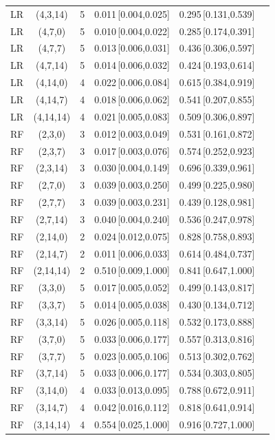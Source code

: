 \begin{longtable}{lccccc}
LR & (4,3,14) & 5 & 0.011\,[0.004,0.025] & 0.295\,[0.131,0.539] \\
LR & (4,7,0) & 5 & 0.010\,[0.004,0.022] & 0.285\,[0.174,0.391] \\
LR & (4,7,7) & 5 & 0.013\,[0.006,0.031] & 0.436\,[0.306,0.597] \\
LR & (4,7,14) & 5 & 0.014\,[0.006,0.032] & 0.424\,[0.193,0.614] \\
LR & (4,14,0) & 4 & 0.022\,[0.006,0.084] & 0.615\,[0.384,0.919] \\
LR & (4,14,7) & 4 & 0.018\,[0.006,0.062] & 0.541\,[0.207,0.855] \\
LR & (4,14,14) & 4 & 0.021\,[0.005,0.083] & 0.509\,[0.306,0.897] \\
RF & (2,3,0) & 3 & 0.012\,[0.003,0.049] & 0.531\,[0.161,0.872] \\
RF & (2,3,7) & 3 & 0.017\,[0.003,0.076] & 0.574\,[0.252,0.923] \\
RF & (2,3,14) & 3 & 0.030\,[0.004,0.149] & 0.696\,[0.339,0.961] \\
RF & (2,7,0) & 3 & 0.039\,[0.003,0.250] & 0.499\,[0.225,0.980] \\
RF & (2,7,7) & 3 & 0.039\,[0.003,0.231] & 0.439\,[0.128,0.981] \\
RF & (2,7,14) & 3 & 0.040\,[0.004,0.240] & 0.536\,[0.247,0.978] \\
RF & (2,14,0) & 2 & 0.024\,[0.012,0.075] & 0.828\,[0.758,0.893] \\
RF & (2,14,7) & 2 & 0.011\,[0.006,0.033] & 0.614\,[0.484,0.737] \\
RF & (2,14,14) & 2 & 0.510\,[0.009,1.000] & 0.841\,[0.647,1.000] \\
RF & (3,3,0) & 5 & 0.017\,[0.005,0.052] & 0.499\,[0.143,0.817] \\
RF & (3,3,7) & 5 & 0.014\,[0.005,0.038] & 0.430\,[0.134,0.712] \\
RF & (3,3,14) & 5 & 0.026\,[0.005,0.118] & 0.532\,[0.173,0.888] \\
RF & (3,7,0) & 5 & 0.033\,[0.006,0.177] & 0.557\,[0.313,0.816] \\
RF & (3,7,7) & 5 & 0.023\,[0.005,0.106] & 0.513\,[0.302,0.762] \\
RF & (3,7,14) & 5 & 0.033\,[0.006,0.177] & 0.534\,[0.303,0.805] \\
RF & (3,14,0) & 4 & 0.033\,[0.013,0.095] & 0.788\,[0.672,0.911] \\
RF & (3,14,7) & 4 & 0.042\,[0.016,0.112] & 0.818\,[0.641,0.914] \\
RF & (3,14,14) & 4 & 0.554\,[0.025,1.000] & 0.916\,[0.727,1.000] \\

\end{longtable}
